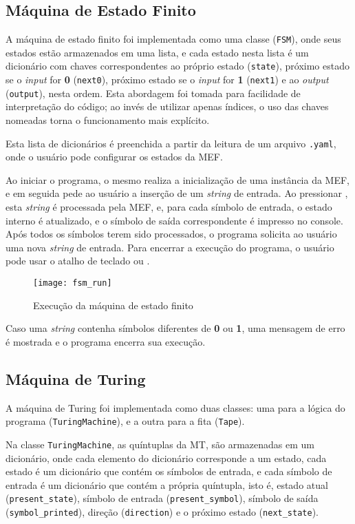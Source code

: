 \subsection{Máquina de Estado Finito}

A máquina de estado finito foi implementada como uma classe (\verb|FSM|), onde
seus estados estão armazenados em uma lista, e cada estado nesta lista é um
dicionário com chaves correspondentes ao próprio estado (\verb|state|),
próximo estado se o \textit{input} for \textbf{0} (\verb|next0|), próximo
estado se o \textit{input} for \textbf{1} (\verb|next1|) e ao \textit{output}
(\verb|output|), nesta ordem. Esta abordagem foi tomada para facilidade de
interpretação do código; ao invés de utilizar apenas índices, o uso das chaves
nomeadas torna o funcionamento mais explícito.

Esta lista de dicionários é preenchida a partir da leitura de um arquivo
\verb|.yaml|, onde o usuário pode configurar os estados da MEF.

Ao iniciar o programa, o mesmo realiza a inicialização de uma instância da MEF,
e em seguida pede ao usuário a inserção de um \textit{string} de entrada. Ao
pressionar \keys{\return}, esta \textit{string} é processada pela MEF, e, para
cada símbolo de entrada, o estado interno é atualizado, e o símbolo de saída
correspondente é impresso no console. Após todos os símbolos terem sido
processados, o programa solicita ao usuário uma nova \textit{string} de entrada.
Para encerrar a execução do programa, o usuário pode usar o atalho de teclado
 ou .

\begin{figure}[H]
    \centering
    \texttt{[image: fsm\_run]}
    \label{fsm_run}
    \caption{Execução da máquina de estado finito}
\end{figure}

Caso uma \textit{string} contenha símbolos diferentes de \textbf{0} ou
\textbf{1}, uma mensagem de erro é mostrada e o programa encerra sua execução.

\subsection{Máquina de Turing}

A máquina de Turing foi implementada como duas classes: uma para a lógica do
programa (\verb|TuringMachine|), e a outra para a fita (\verb|Tape|).

Na classe \verb|TuringMachine|, as quíntuplas da MT, são armazenadas em um
dicionário, onde cada elemento do dicionário corresponde a um estado, cada
estado é um dicionário que contém os símbolos de entrada, e cada símbolo de
entrada é um dicionário que contém a própria quíntupla, isto é, estado atual
(\verb|present_state|), símbolo de entrada (\verb|present_symbol|), símbolo de
saída \linebreak (\verb|symbol_printed|), direção (\verb|direction|) e o próximo
estado (\verb|next_state|).

